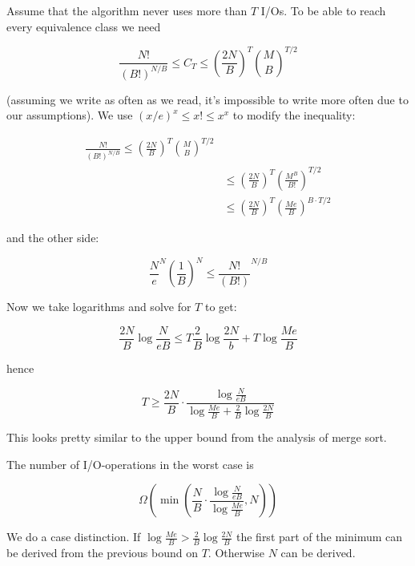 Assume that the algorithm never uses more than $T$ I/Os. To be able to reach every equivalence class we need

\[\frac{N!}{(B!)^{N/B}} \leq C_T \leq \left(\frac{2N}{B}\right)^T {{M}\choose{B}}^{T/2}\]

(assuming we write as often as we read, it's impossible to write more often due to our assumptions). We use $(x/e)^x\leq x! \leq x^x$ to modify the inequality:

\begin{align*}
\frac{N!}{(B!)^{N/B}} \leq \left(\frac{2N}{B}\right)^T {{M}\choose{B}}^{T/2}\\
	&\leq \left(\frac{2N}{B}\right)^T \left(\frac{M^B}{B!}\right)^{T/2}\\
	&\leq \left(\frac{2N}{B}\right)^T \left(\frac{Me}{B}\right)^{B \cdot T/2}
\end{align*}

and the other side:

\[\frac{N}{e}^N \left(\frac{1}{B}\right)^N \leq \frac{N!}{(B!)}^{N/B}\]

Now we take logarithms and solve for $T$ to get:

\[\frac{2N}{B} \log \frac{N}{eB} \leq T\frac{2}{B} \log \frac{2N}{b} + T \log \frac{Me}{B}\]

hence

\[T\geq \frac{2N}{B} \cdot \frac{\log \frac{N}{eB}}{\log \frac{Me}{B} + \frac{2}{B} \log \frac{2N}{B}}\]

This looks pretty similar to the upper bound from the analysis of merge sort.

\begin{thm} The number of I/O-operations in the worst case is 

\[\Omega\left(\min \left(\frac{N}{B} \cdot \frac{\log \frac{N}{eB}}{\log \frac{Me}{B}}, N\right)\right)\]
\end{thm}

\begin{pr} We do a case distinction. If $\log \frac{Me}{B} > \frac 2B \log \frac{2N}{B}$ the first part of the minimum can be derived from the previous bound on $T$. Otherwise $N$ can be derived.
\end{pr}


